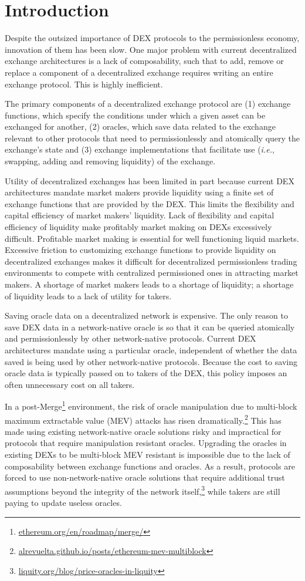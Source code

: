 \documentclass[tikz]{article}
\newcommand{\fref}[1]{\footnote{\href{http://#1}{#1}}}
\begin{document}
\section{Introduction}
Despite the outsized importance of DEX protocols to the permissionless economy, innovation of them has been slow. One major problem with current decentralized exchange architectures is a lack of composability, such that to add, remove or replace a component of a decentralized exchange requires writing an entire exchange protocol. This is highly inefficient.

The primary components of a decentralized exchange protocol are (1) exchange functions, which specify the conditions under which a given asset can be exchanged for another, (2) oracles, which save data related to the exchange relevant to other protocols that need to permissionlessly and atomically query the exchange's state and (3) exchange implementations that facilitate use (\textit{i.e.}, swapping, adding and removing liquidity) of the exchange.

Utility of decentralized exchanges has been limited in part because current DEX architectures mandate market makers provide liquidity using a finite set of exchange functions that are provided by the DEX. This limits the flexibility and capital efficiency of market makers' liquidity. Lack of flexibility and capital efficiency of liquidity make profitably market making on DEXs excessively difficult. Profitable market making is essential for well functioning liquid markets. Excessive friction to customizing exchange functions to provide liquidity on decentralized exchanges makes it difficult for decentralized permissionless trading environments to compete with centralized permissioned ones in attracting market makers. A shortage of market makers leads to a shortage of liquidity; a shortage of liquidity leads to a lack of utility for takers. 

Saving oracle data on a decentralized network is expensive. The only reason to save DEX data in a network-native oracle is so that it can be queried atomically and permissionlessly by other network-native protocols. Current DEX architectures mandate using a particular oracle, independent of whether the data saved is being used by other network-native protocols. Because the cost to saving oracle data is typically passed on to takers of the DEX, this policy imposes an often unnecessary cost on all takers. 

In a post-Merge\fref{ethereum.org/en/roadmap/merge/} environment, the risk of oracle manipulation due to multi-block maximum extractable value (MEV) attacks has risen dramatically.\fref{alrevuelta.github.io/posts/ethereum-mev-multiblock} This has made using existing network-native oracle solutions risky and impractical for protocols that require manipulation resistant oracles. Upgrading the oracles in existing DEXs to be multi-block MEV resistant is impossible due to the lack of composability between exchange functions and oracles. As a result, protocols are forced to use non-network-native oracle solutions that require additional trust assumptions beyond the integrity of the network itself,\fref{liquity.org/blog/price-oracles-in-liquity} while takers are still paying to update useless oracles.
\end{document}

